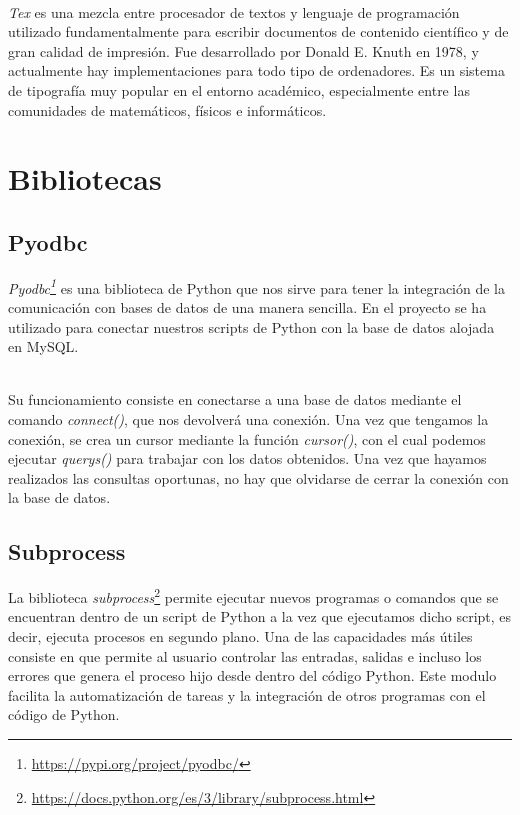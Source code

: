 \documentclass[a4paper, 12pt]{book}
\begin{document}
\\\textit{Tex} es una mezcla entre procesador de textos y lenguaje de programación utilizado fundamentalmente para escribir documentos de contenido científico
y de gran calidad de impresión. Fue desarrollado por Donald E. Knuth en 1978, y actualmente hay implementaciones para todo tipo de ordenadores.
Es un sistema de tipografía muy popular en el entorno académico, especialmente entre las comunidades de matemáticos, físicos e informáticos.

\section{Bibliotecas} 
\label{sec:librerias}

\subsection{Pyodbc}
\label{subsec:pyodbc}

\textit{Pyodbc\footnote{\url{https://pypi.org/project/pyodbc/}}} es una biblioteca de Python que nos sirve para tener la integración de la comunicación con bases de datos de una manera sencilla. En el 
proyecto se ha utilizado para conectar nuestros scripts de Python con la base de datos alojada en MySQL.

\\Su funcionamiento consiste en conectarse a una base de datos mediante el comando \textit{connect()}, que nos devolverá una conexión. Una vez que tengamos
la conexión, se crea un cursor mediante la función \textit{cursor()}, con el cual podemos ejecutar \textit{querys()} para trabajar con los datos obtenidos. Una vez
que hayamos realizados las consultas oportunas, no hay que olvidarse de cerrar la conexión con la base de datos.

\subsection{Subprocess}
\label{subsec:subprocess}

La biblioteca \textit{subprocess}\footnote{\url{https://docs.python.org/es/3/library/subprocess.html}} permite ejecutar nuevos programas o comandos que se encuentran dentro de un script de Python a la vez que ejecutamos dicho script, es decir, ejecuta
procesos en segundo plano. Una de las capacidades más útiles consiste en que permite al usuario controlar las entradas, salidas e incluso los errores que genera el proceso hijo desde
dentro del código Python. Este modulo facilita la automatización de tareas y la integración de otros programas con el código de Python.
\end{document}
